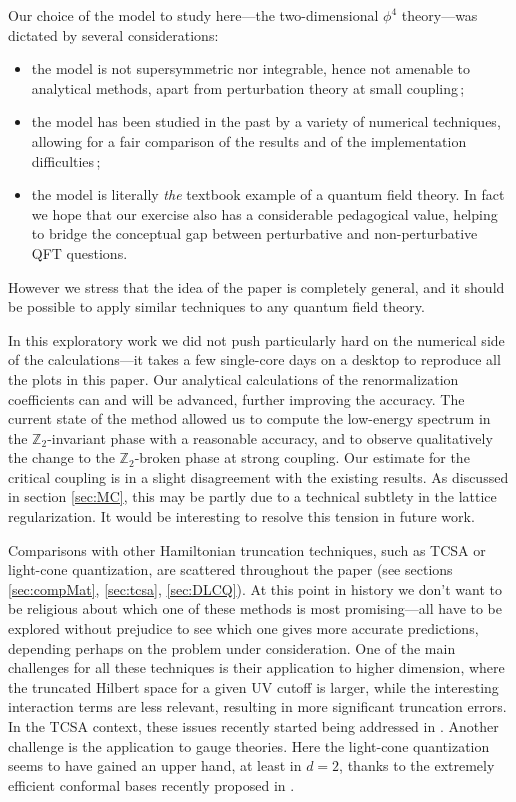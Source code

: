 \documentclass[11pt]{article}
\def\bZ {\mathbb{Z}}
\def\bZ {\mathbb{Z}}
\numberwithin{equation}{section}
\begin{document}
Our choice of the model to study here---the two-dimensional $\phi^4$ theory---was dictated by several considerations:
\begin{itemize}
\item the model is not supersymmetric nor integrable, hence not amenable to analytical methods, apart from perturbation theory at small coupling\,;
\item the model has been studied in the past by a variety of numerical techniques, allowing for a fair comparison of the results and of the implementation difficulties\,; 
\item the model is literally \emph{the} textbook example of a quantum field theory. In fact we hope that our exercise also has a considerable pedagogical value, helping to bridge the conceptual gap between perturbative and non-perturbative QFT questions.
\end{itemize}
However we stress that the idea of the paper is completely general, and it should be possible to apply similar techniques to any quantum field theory.

In this exploratory work we did not push particularly hard on the numerical side of the calculations---it takes a few single-core days on a desktop to reproduce all the plots in this paper. Our analytical calculations of the renormalization coefficients can and will be advanced, further improving the accuracy. The current state of the method allowed us to compute the low-energy spectrum in the $\bZ_2$-invariant phase with a reasonable accuracy, and to observe qualitatively the change to the $\bZ_2$-broken phase at strong coupling. Our estimate for the critical coupling is in a slight disagreement with the existing results. As discussed in section \ref{sec:MC}, this may be partly due to a technical subtlety in the lattice regularization. It would be interesting to resolve this tension in future work.

Comparisons with other Hamiltonian truncation techniques, such as TCSA or light-cone quantization, are scattered throughout the paper (see sections \ref{sec:compMat}, \ref{sec:tcsa}, \ref{sec:DLCQ}). At this point in history we don't want to be religious about which one of these methods is most promising---all have to be explored without prejudice to see which one gives more accurate predictions, depending perhaps on the problem under consideration. One of the main challenges for all these techniques is their application to higher dimension, where the truncated Hilbert space for a given UV cutoff is larger, while the interesting interaction terms are less relevant, resulting in more significant truncation errors. In the TCSA context, these issues recently started being addressed in \cite{Hogervorst:2014rta}. Another challenge is the application to gauge theories. Here the light-cone quantization seems to have gained an upper hand, at least in $d=2$, thanks to the extremely efficient conformal bases recently proposed in \cite{Katz:2013qua,Katz:2014uoa}.
\end{document}
